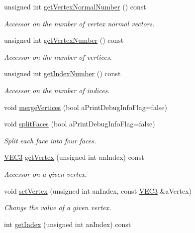 \begin{DoxyCompactItemize}
unsigned int \hyperlink{class_graphics_1_1_polygon_mesh_ac0d769a296df3f78a918f63f04bce338}{getVertexNormalNumber} () const 
\begin{DoxyCompactList}\small\item\em Accessor on the number of vertex normal vectors. \end{DoxyCompactList}\item 
unsigned int \hyperlink{class_graphics_1_1_polygon_mesh_aaca647be2d7c9e9168915c106cc6a162}{getVertexNumber} () const 
\begin{DoxyCompactList}\small\item\em Accessor on the number of vertices. \end{DoxyCompactList}\item 
unsigned int \hyperlink{class_graphics_1_1_polygon_mesh_af7b8cf4fd0544ceeabe2b97b85893314}{getIndexNumber} () const 
\begin{DoxyCompactList}\small\item\em Accessor on the number of indices. \end{DoxyCompactList}\item 
void \hyperlink{class_graphics_1_1_polygon_mesh_a4eabb8a7f457991de920d772c9b72745}{mergeVertices} (bool aPrintDebugInfoFlag=false)
\item 
void \hyperlink{class_graphics_1_1_polygon_mesh_a7e12700ce99e0c122e72d4897bd64f95}{splitFaces} (bool aPrintDebugInfoFlag=false)
\begin{DoxyCompactList}\small\item\em Split each face into four faces. \end{DoxyCompactList}\item 
\hyperlink{class_math_1_1_vec3}{VEC3} \hyperlink{class_graphics_1_1_polygon_mesh_a9fd98d97b7ce3585fa1af572002cc27c}{getVertex} (unsigned int anIndex) const 
\begin{DoxyCompactList}\small\item\em Accessor on a given vertex. \end{DoxyCompactList}\item 
void \hyperlink{class_graphics_1_1_polygon_mesh_a700da528621a371bb989cfb2fa39b49e}{setVertex} (unsigned int anIndex, const \hyperlink{class_math_1_1_vec3}{VEC3} \&aVertex)
\begin{DoxyCompactList}\small\item\em Change the value of a given vertex. \end{DoxyCompactList}\item 
int \hyperlink{class_graphics_1_1_polygon_mesh_a32645e7e4b5303bcf4b9fa63efe86a98}{getIndex} (unsigned int anIndex) const 

\end{DoxyCompactItemize}
